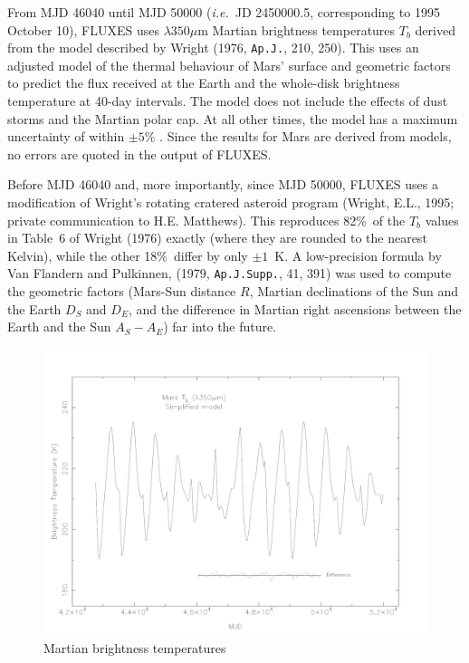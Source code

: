 \documentclass[11pt,twoside]{article}
\renewcommand{\_}{\texttt{\symbol{95}}}
\begin{document}
From MJD 46040 until MJD 50000 ({\em{i.e.}}\ JD 2450000.5, corresponding to 1995
October 10), FLUXES uses $\lambda350\mu$m Martian brightness temperatures
$T_b$ derived from the model described by Wright (1976, {\tt{Ap.J.}}, 210, 250).
This uses an adjusted model of the thermal
behaviour of Mars' surface and geometric factors to predict the flux received at
the Earth and the whole-disk brightness temperature at 40-day intervals. The
model does not include the effects of dust storms and the Martian polar cap. At
all other times, the model has a maximum uncertainty of within $\pm5$\% . Since
the results for Mars are derived from models, no errors are quoted in the output
of FLUXES.

Before MJD 46040 and, more importantly, since MJD 50000, FLUXES uses a
modification of Wright's rotating cratered asteroid program (Wright,
E.L., 1995; private communication to H.E. Matthews). This reproduces
82\%\ of the $T_b$ values in Table~6 of Wright (1976) exactly (where they are
rounded to the nearest Kelvin), while the other 18\%\ differ by only $\pm1$~K.
A low-precision formula by Van Flandern and Pulkinnen,
(1979, {\tt{Ap.J.Supp.}}, 41, 391)
was used to compute the geometric factors (Mars-Sun
distance $R$, Martian declinations of the Sun and the Earth $D_S$ and $D_E$,
and the difference in Martian right ascensions between the Earth and the Sun
$A_S - A_E$) far into the future.

\begin{figure}
\includegraphics[angle=-90,width=\textwidth]{sun213_fig1}
\vspace*{-0.5cm}
\caption{Martian brightness temperatures}
\label{fig:mars}
\end{figure}
\end{document}
